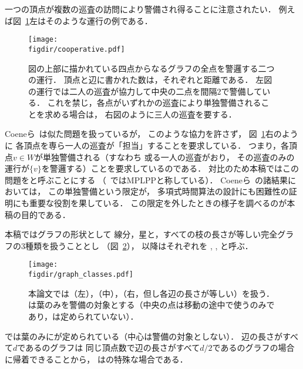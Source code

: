 一つの頂点が複数の巡査の訪問により警備され得ることに注意されたい．
例えば図~\ref{figure: cooperative}左はそのような運行の例である．
\begin{figure}
  \begin{center}
    \texttt{[image: \\figdir/cooperative.pdf]}
    \caption{図の上部に描かれている四点からなるグラフの全点を警邏する二つの運行．
      頂点と辺に書かれた数は，それぞれ{\maxIdletime}と距離である．
      左図の運行では二人の巡査が協力して中央の二点を間隔$2$で警備している．
      これを禁じ，各点がいずれかの巡査により単独警備されることを求める場合は，
      右図のように三人の巡査を要する．}
    \label{figure: cooperative}
  \end{center}
\end{figure}
Coeneら~\cite{coene2011charlemagne}は似た問題を扱っているが，
このような協力を許さず，
図~\ref{figure: cooperative}右のように
各頂点を専ら一人の巡査が「担当」することを要求している．
つまり，各頂点$v \in W$が単独警備される（すなわち
或る一人の巡査がおり，
その巡査のみの運行が$\{v\}$を警邏する）ことを要求しているのである．
対比のため本稿ではこの問題を{\independentPatProb}と呼ぶことにする
（~\cite{coene2011charlemagne}ではMPLPPと称している）．
Coeneら~\cite{coene2011charlemagne}の諸結果においては，
この単独警備という限定が，
多項式時間算法の設計にも困難性の証明にも重要な役割を果している．
この限定を外したときの様子を調べるのが本稿の目的である．

本稿ではグラフの形状として
線分，星と，すべての枝の長さが等しい完全グラフの3種類を扱うこととし
（図~\ref{figure: graph_classes}），
以降はそれぞれを {\graphLine}, {\graphStar}, {\graphUnit}と呼ぶ．
\begin{figure}
  \begin{center}
    \texttt{[image: \\figdir/graph\_classes.pdf]}
    \caption{本論文では{\graphLine}（左），{\graphStar}（中），{\graphUnit}（右，但し各辺の長さが等しい）を扱う．{\graphStar}は葉のみを警備の対象とする（中央の点は移動の途中で使うのみであり，{\maxIdletime}は定められていない）．}
    \label{figure: graph_classes}
  \end{center}
\end{figure}
{\graphStar}では葉のみに{\maxIdletime}が定められている（中心は警備の対象としない）．
辺の長さがすべて$d$である{\graphUnit}のグラフは
同じ頂点数で辺の長さがすべて$d/2$である{\graphStar}のグラフの場合に帰着できることから，
{\graphUnit}は{\graphStar}の特殊な場合である．


